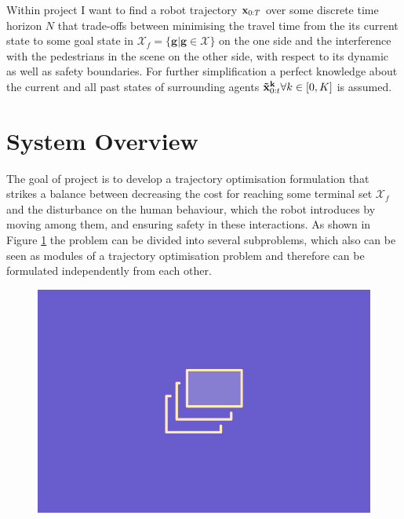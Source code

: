 Within project \project I want to find a robot trajectory $\mathbf{x}_{0:T}$ over some discrete time horizon $N$ that trade-offs between minimising the travel time from the its current state to some goal state in $\mathcal{X}_f = \{\mathbf{g} | \mathbf{g} \in \mathcal{X} \}$ on the one side and the interference with the pedestrians in the scene on the other side, with respect to its dynamic as well as safety boundaries. For further simplification a perfect knowledge about the current and all past states of surrounding agents $\xped[k]_{0:t} \forall k \in [0, K]$ is assumed. 

\section{System Overview}
\label{text:approach/overview}
The goal of project \project is to develop a trajectory optimisation formulation that strikes a balance between decreasing the cost for reaching some terminal set $\mathcal{X}_f$ and the disturbance on the human behaviour, which the robot introduces by moving among them, and ensuring safety in these interactions. As shown in Figure \ref{img:information_flow} the problem can be divided into several subproblems, which also can be seen as modules of a trajectory optimisation problem and therefore can be formulated independently from each other. 

\begin{figure}[!ht]
\begin{center}
\includegraphics[width=\imgwidth]{images/placeholder.png}
\label{img:information_flow}
\end{center}
\end{figure}

